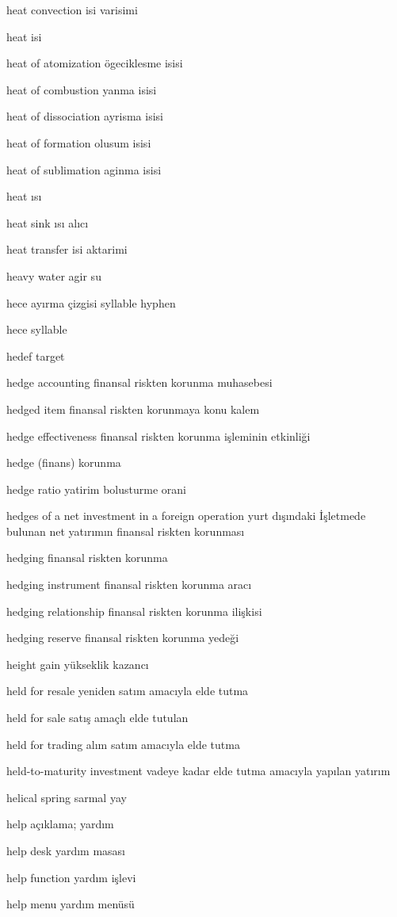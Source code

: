 \documentclass[12pt,fleqn]{article}\usepackage{../../common}
\begin{document}
heat convection isi varisimi

heat isi

heat of atomization ögeciklesme isisi

heat of combustion yanma isisi

heat of dissociation ayrisma isisi

heat of formation olusum isisi

heat of sublimation aginma isisi

heat ısı

heat sink ısı alıcı

heat transfer isi aktarimi

heavy water agir su

hece ayırma çizgisi syllable hyphen

hece syllable

hedef target

hedge accounting finansal riskten korunma muhasebesi

hedged item finansal riskten korunmaya konu kalem

hedge effectiveness finansal riskten korunma işleminin etkinliği

hedge (finans) korunma

hedge ratio yatirim bolusturme orani

hedges of a net investment in a foreign operation yurt dışındaki İşletmede bulunan net yatırımın finansal riskten korunması

hedging finansal riskten korunma

hedging instrument finansal riskten korunma aracı

hedging relationship finansal riskten korunma ilişkisi

hedging reserve finansal riskten korunma yedeği

height gain yükseklik kazancı

held for resale yeniden satım amacıyla elde tutma

held for sale satış amaçlı elde tutulan

held for trading alım satım amacıyla elde tutma

held-to-maturity investment vadeye kadar elde tutma amacıyla yapılan yatırım

helical spring sarmal yay

help açıklama; yardım

help desk yardım masası

help function yardım işlevi

help menu yardım menüsü
\end{document}

